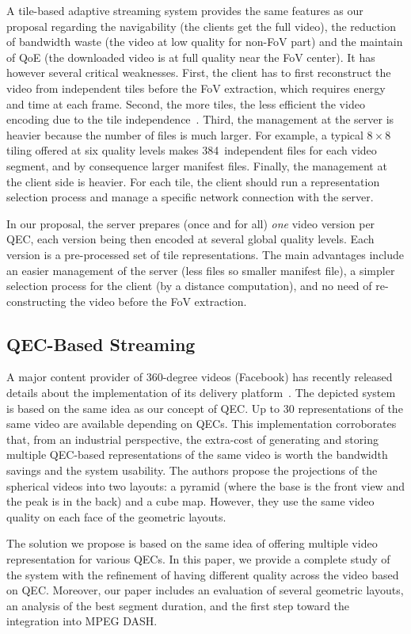A tile-based adaptive streaming
system provides the same features as our proposal regarding the navigability (the clients 
get the full video), the reduction of bandwidth 
waste (the video at low quality for non-\ac{FoV} part) and the maintain of \ac{QoE} (the downloaded video is at full quality near the 
FoV center). It has however several critical weaknesses. First, the client has to first reconstruct
the video from independent tiles before the FoV extraction, which requires energy and 
time at each frame. Second, the more tiles, the less efficient the video encoding due to the
tile independence~\cite{sanchez_compressed_2015}. Third, the management at the server is
heavier because the number of files 
is much larger. For example, a typical $8\times8$ tiling offered at six quality levels makes 
384~independent files for each video segment, and by consequence larger manifest files.
Finally, the management at the client side is heavier. For each tile, the client should run
a representation selection process 
and manage a specific network connection with the server.

 In our proposal, the server prepares (once and for 
all) \emph{one} video version per
\ac{QEC}, each version being then encoded at several global quality levels. Each version
is a pre-processed set of tile representations. The main advantages include an easier 
management of the server
(less files so smaller manifest file), a simpler selection process for the client (by
a distance computation), and no need of re-constructing the video before the \ac{FoV} extraction.

\subsection{QEC-Based Streaming}

A major content provider of 360-degree videos (Facebook) has recently
released details about the
implementation of its delivery platform~\cite{facebook}. The depicted system is based
on the same idea as our concept of \ac{QEC}. Up to 30 representations of the same video 
are available depending on
\acp{QEC}. This implementation corroborates that, from an industrial perspective, the
extra-cost of
generating and storing multiple \ac{QEC}-based representations of the same video 
is worth the bandwidth
savings and the system usability. The authors propose the projections of the spherical videos into two layouts: a pyramid (where the
base is the front
view and the peak is in the back) and a cube map. However, they use the same video quality 
on each face of the geometric layouts.

The
solution we propose is based on the same idea of offering multiple video representation 
for various \acp{QEC}. 
In this paper, we provide a complete study of 
the system with the refinement of having different quality across the video based on \ac{QEC}. 
Moreover, our 
paper includes an evaluation of several geometric layouts, an analysis of the best segment
duration, and the first step toward the integration into MPEG \ac{DASH}.